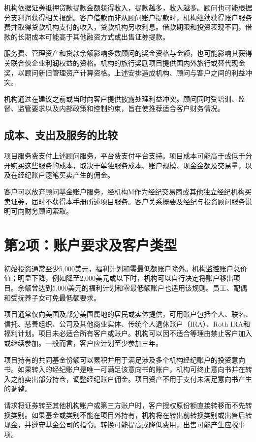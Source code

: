 \documentclass[UTF8,fontset=none,11pt,a4paper]{ctexart}
\begin{document}
机构依据证券抵押贷款提款金额获得收入，提款越多，收入越多。顾问也可能根据分支利润获得相关报酬。客户借款而非从顾问账户提款时，机构继续获得账户服务费并取得贷款机构支付的收入，贷款机构另收利息。借款期限和投资表现不同，借款的长期成本可能高于其他融资方式或出售\allowbreak\mbox{证券提款。}


服务费、管理资产和贷款余额影响多数顾问的奖金资格与金额，也可能影响其获得关联合伙企业利润权益的资格。机构的旅行奖励项目提供国内外旅行或替代现金奖，以顾问新旧管理资产计算资格。上述安排造成机构、顾问与客户之间的\allowbreak\mbox{利益冲突。}


机构通过在建议之前或当时向客户提供披露处理利益冲突。顾问同时受培训、监督、监管要求以及内部政策和控制约束，旨在使推荐适合客户\allowbreak\mbox{财务情况。}


\subsection*{成本、支出及服务的比较}
项目服务费支付上述顾问服务，平台费支付平台支持。项目成本可能高于或低于分开购买这些服务的成本，取决于单独服务成本、账户规模、现金金额及交易量，以及在经纪账户逐笔买卖产\allowbreak\mbox{生的佣金。}


客户可以放弃顾问基金账户服务，经机构M作为经纪交易商或其他独立经纪机构买卖证券，届时不获得本手册所述项目服务。客户关系概要及经纪与投资顾问服务说明可向财务\allowbreak\mbox{顾问索取。}


\section*{第2项：账户要求及客户类型}
初始投资通常至少5,000美元，福利计划和零最低额账户除外。机构监控账户总价值；明显下降，例如降至2,000美元或以下时，机构可以自行决定将账户移出项目。余额曾达到5,000美元的福利计划和零最低额账户也适用该规则。员工、配偶和受抚养子女可免最\allowbreak\mbox{低额要求。}


项目通常仅向美国及部分美国属地的居民或实体提供，可用账户包括个人、联名、信托、慈善组织、公司及其他商业实体、传统个人退休账户（IRA）、Roth IRA和福利计划。项目未必适合所有客户或账户。机构可以因不适合等理由禁止客户加入或继续参加。一般而言，客户应计划至少参\allowbreak\mbox{加三年。}


项目持有的共同基金份额可以累积并用于满足涉及多个机构经纪账户的投资意向书。如果转入的经纪账户是唯一可满足该意向书的账户，机构可终止意向书并在转入之前卖出部分持仓，调整经纪账户佣金。项目资产不用于支付未满足意向书产\allowbreak\mbox{生的调整。}


请求将证券转至其他机构账户或第三方账户时，客户授权原份额直接转移而不先转换类别。如果基金或类别不能在项目外持有，机构将在转出前转换类别或出售后转现金，并遵守基金公司的指令。转换可能提高或降低费用，出售可能产生\allowbreak\mbox{应税事项。}
\end{document}
